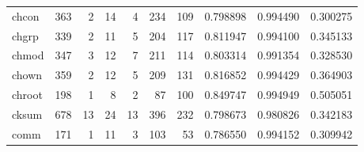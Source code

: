 \begin{longtable}{lrrrrrrrrr}
chcon     &                    363 &                                  2 &                                14 &                                4 &                               234 &                             109 &                                0.798898 &                               0.994490 &                             0.300275 \\
chgrp     &                    339 &                                  2 &                                11 &                                5 &                               204 &                             117 &                                0.811947 &                               0.994100 &                             0.345133 \\
chmod     &                    347 &                                  3 &                                12 &                                7 &                               211 &                             114 &                                0.803314 &                               0.991354 &                             0.328530 \\
chown     &                    359 &                                  2 &                                12 &                                5 &                               209 &                             131 &                                0.816852 &                               0.994429 &                             0.364903 \\
chroot    &                    198 &                                  1 &                                 8 &                                2 &                                87 &                             100 &                                0.849747 &                               0.994949 &                             0.505051 \\
cksum     &                    678 &                                 13 &                                24 &                               13 &                               396 &                             232 &                                0.798673 &                               0.980826 &                             0.342183 \\
comm      &                    171 &                                  1 &                                11 &                                3 &                               103 &                              53 &                                0.786550 &                               0.994152 &                             0.309942 \\

\end{longtable}
